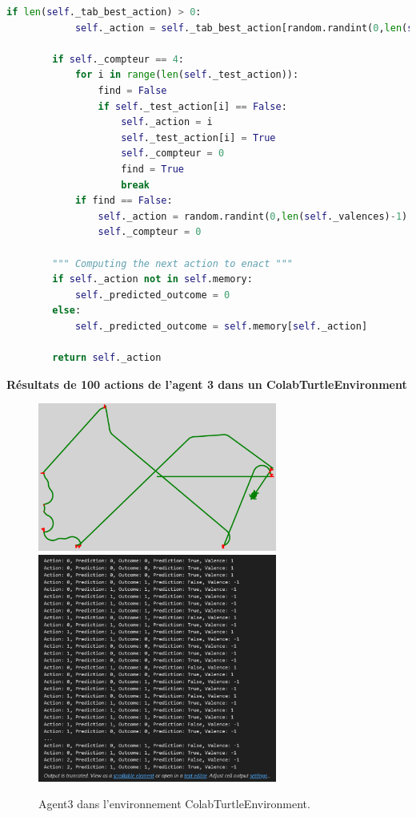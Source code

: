 \documentclass[a4paper, 12pt]{article}
\begin{document}
\begin{lstlisting}[language=Python]
        if len(self._tab_best_action) > 0:
            self._action = self._tab_best_action[random.randint(0,len(self._tab_best_action)-1)]
        
        if self._compteur == 4:
            for i in range(len(self._test_action)):
                find = False
                if self._test_action[i] == False:
                    self._action = i
                    self._test_action[i] = True
                    self._compteur = 0
                    find = True
                    break
            if find == False:
                self._action = random.randint(0,len(self._valences)-1)
                self._compteur = 0
        
        """ Computing the next action to enact """
        if self._action not in self.memory:
            self._predicted_outcome = 0
        else:
            self._predicted_outcome = self.memory[self._action]
            
        return self._action
\end{lstlisting}

\newpage

\noindent \large \textbf{Résultats de 100 actions de l'agent 3 dans un ColabTurtleEnvironment}
\normalsize

\begin{figure}[h]
    \centering
    \includegraphics[width=0.7\textwidth]{ReportImages/Agent3/Agent3_tortue.png}
    \includegraphics[width=0.7\textwidth]{ReportImages/Agent3/Agent3_100_actions.png}
    \caption{Agent3 dans l'environnement ColabTurtleEnvironment.}
    \label{fig:agent3_envTurtle}
\end{figure}
\end{document}

